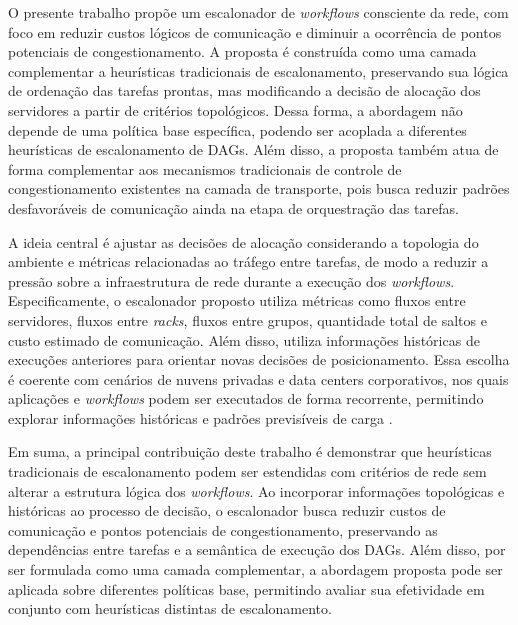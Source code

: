 \documentclass[12pt]{article}
\begin{document}
O presente trabalho propõe um escalonador de \textit{workflows} consciente da rede, com foco em reduzir custos lógicos de comunicação e diminuir a ocorrência de pontos potenciais de congestionamento. 
%
A proposta é construída como uma camada complementar a heurísticas tradicionais de escalonamento, preservando sua lógica de ordenação das tarefas prontas, mas modificando a decisão de alocação dos servidores a partir de critérios topológicos. 
%
Dessa forma, a abordagem não depende de uma política base específica, podendo ser acoplada a diferentes heurísticas de escalonamento de DAGs. 
%
Além disso, a proposta também atua de forma complementar aos mecanismos tradicionais de controle de congestionamento existentes na camada de transporte, pois busca reduzir padrões desfavoráveis de comunicação ainda na etapa de orquestração das tarefas.

A ideia central é ajustar as decisões de alocação considerando a topologia do ambiente e métricas relacionadas ao tráfego entre tarefas, de modo a reduzir a pressão sobre a infraestrutura de rede durante a execução dos \textit{workflows}.
%
Especificamente, o escalonador proposto utiliza métricas como fluxos entre servidores, fluxos entre \textit{racks}, fluxos entre grupos, quantidade total de saltos e custo estimado de comunicação. 
%
Além disso, utiliza informações históricas de execuções anteriores para orientar novas decisões de posicionamento. Essa escolha é coerente com cenários de nuvens privadas e data centers corporativos, nos quais aplicações e \textit{workflows} podem ser executados de forma recorrente, permitindo explorar informações históricas e padrões previsíveis de carga \cite{nist500292,jalaparti2015network}.

Em suma, a principal contribuição deste trabalho é demonstrar que heurísticas tradicionais de escalonamento podem ser estendidas com critérios de rede sem alterar a estrutura lógica dos \textit{workflows}. 
%
Ao incorporar informações topológicas e históricas ao processo de decisão, o escalonador busca reduzir custos de comunicação e pontos potenciais de congestionamento, preservando as dependências entre tarefas e a semântica de execução dos DAGs. 
%
Além disso, por ser formulada como uma camada complementar, a abordagem proposta pode ser aplicada sobre diferentes políticas base, permitindo avaliar sua efetividade em conjunto com heurísticas distintas de escalonamento.
\end{document}
